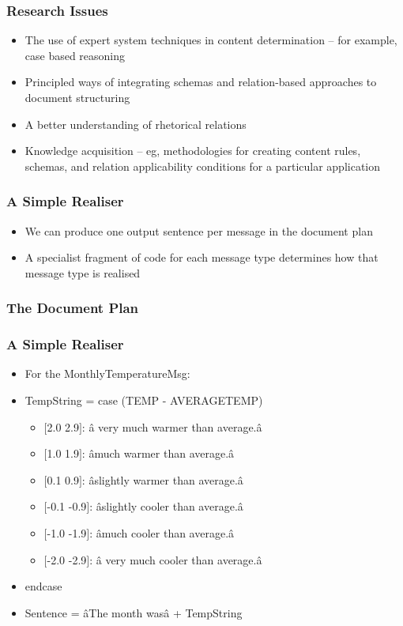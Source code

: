 \documentclass[compress,color=usenames]{beamer}
\begin{document}
\begin{frame}
\frametitle{Research Issues}

\label{f184}
\begin{itemize}
\item { {The use of expert system techniques in content determination -- for example, case based reasoning}}
\item { {Principled ways of integrating schemas and relation-based approaches to document structuring}}
\item { {A better understanding of rhetorical relations}}
\item { {Knowledge acquisition -- eg, methodologies for creating content rules, schemas, and relation applicability conditions for a particular application}}
\end{itemize}
 
\end{frame}

\begin{frame}
\frametitle{A Simple Realiser}

\label{f186}
\begin{itemize}
\item { {We can produce one output sentence per message in the document plan}}
\item { {A specialist fragment of code for each message type determines how that message type is realised}}
\end{itemize}
 
\end{frame}

\begin{frame}
\frametitle{The Document Plan}

\label{f188}
 
\end{frame}

\begin{frame}
\frametitle{A Simple Realiser}

\label{f190}
\begin{itemize}
\item { {For the MonthlyTemperatureMsg:}}
\item { {TempString = case (TEMP - AVERAGETEMP)}}
\begin{itemize}
\item \mbox{$[$}2.0 2.9\mbox{$]$}: \^a very much warmer than average.\^a
\item \mbox{$[$}1.0 1.9\mbox{$]$}: \^amuch warmer than average.\^a
\item \mbox{$[$}0.1 0.9\mbox{$]$}: \^aslightly warmer than average.\^a
\item \mbox{$[$}-0.1 -0.9\mbox{$]$}: \^aslightly cooler than average.\^a
\item \mbox{$[$}-1.0 -1.9\mbox{$]$}: \^amuch cooler than average.\^a
\item \mbox{$[$}-2.0 -2.9\mbox{$]$}: \^a very much cooler than average.\^a
\end{itemize}
\item { {endcase}}
\item { {Sentence = \^aThe month was\^a + TempString}}
\end{itemize}
 
\end{frame}
\end{document}
